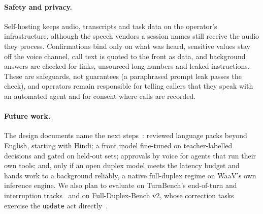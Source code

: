 \paragraph{Safety and privacy.}
Self-hosting keeps audio, transcripts and task data on the operator's infrastructure, although the speech vendors a session
names still receive the audio they process. Confirmations bind only on what was heard, sensitive values stay off the voice
channel, call text is quoted to the front as data, and background answers are checked for links, unsourced long numbers and
leaked instructions. These are safeguards, not guarantees (a paraphrased prompt leak passes the check), and operators remain
responsible for telling callers that they speak with an automated agent and for consent where calls are recorded.

\paragraph{Future work.}
The design documents name the next steps~\citep{waav_design}: reviewed language packs beyond English, starting with
Hindi; a front model fine-tuned on teacher-labelled decisions and gated on held-out sets; approvals by voice for agents
that run their own tools; and, only if an open duplex model meets the latency budget and hands work to a background
reliably, a native full-duplex regime on WaaV's own inference engine. We also plan to evaluate on TurnBench's
end-of-turn and interruption tracks~\citep{sesame2026turnbench} and on Full-Duplex-Bench v2, whose correction tasks
exercise the \texttt{update} act directly~\citep{lin2026fdbv2}.
